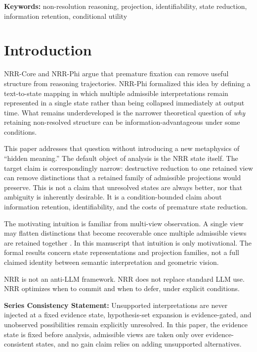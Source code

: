 \documentclass[11pt,a4paper]{article}
\begin{document}
\noindent\textbf{Keywords:} non-resolution reasoning, projection, identifiability, state reduction, information retention, conditional utility

\section{Introduction}
\label{sec:intro}

NRR-Core \cite{saito2025nrr} and NRR-Phi \cite{saito2026phi} argue that premature fixation can remove useful structure from reasoning trajectories. NRR-Phi \cite{saito2026phi} formalized this idea by defining a text-to-state mapping in which multiple admissible interpretations remain represented in a single state rather than being collapsed immediately at output time. What remains underdeveloped is the narrower theoretical question of \emph{why} retaining non-resolved structure can be information-advantageous under some conditions.

This paper addresses that question without introducing a new metaphysics of ``hidden meaning.'' The default object of analysis is the NRR state itself. The target claim is correspondingly narrow: destructive reduction to one retained view can remove distinctions that a retained family of admissible projections would preserve. This is not a claim that unresolved states are always better, nor that ambiguity is inherently desirable. It is a condition-bounded claim about information retention, identifiability, and the costs of premature state reduction.

The motivating intuition is familiar from multi-view observation. A single view may flatten distinctions that become recoverable once multiple admissible views are retained together \cite{hartley2004multiple}. In this manuscript that intuition is only motivational. The formal results concern state representations and projection families, not a full claimed identity between semantic interpretation and geometric vision.

NRR is not an anti-LLM framework.
NRR does not replace standard LLM use.
NRR optimizes when to commit and when to defer, under explicit conditions.

\textbf{Series Consistency Statement:}
Unsupported interpretations are never injected at a fixed evidence state, hypothesis-set expansion is evidence-gated, and unobserved possibilities remain explicitly unresolved. In this paper, the evidence state is fixed before analysis, admissible views are taken only over evidence-consistent states, and no gain claim relies on adding unsupported alternatives.
\end{document}
